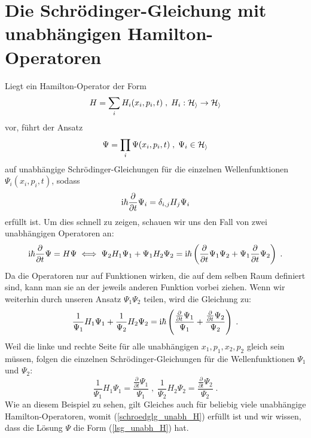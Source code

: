 \section{Die Schrödinger-Gleichung mit unabhängigen Hamilton-Operatoren}
  Liegt ein Hamilton-Operator der Form
  \begin{equation}
    H = \sum_i H_i(x_i,p_i,t) \;,\; H_i : \cal H_i \rightarrow H_i
    \label{unabh_H}
  \end{equation}
  vor, führt der Ansatz
  \begin{equation}
    \Psi = \prod_i \Psi(x_i,p_i,t) \; , \; \Psi_i \in \cal H_i
    \label{lsg_unabh_H}
  \end{equation}
  auf unabhängige Schrödinger-Gleichungen für die einzelnen Wellenfunktionen \\ $\Psi_i(x_i,p_i,t)$, sodass %
  \begin{equation}
    \text i \hbar \frac{\partial}{\partial t}\Psi_i = \delta_{i,j}  H_j \Psi_i
    \label{schroedglg_unabh_H}
  \end{equation}
  erfüllt ist.
  Um dies schnell zu zeigen, schauen wir uns den Fall von zwei unabhängigen Operatoren an:
  \begin{align}
    \begin{split}
      \text i \hbar \frac{\partial}{\partial t} \Psi = H\Psi \iff \Psi_2 H_1 \Psi_1 + \Psi_1 H_2 \Psi_2 = \text i \hbar \left(\frac{\partial}{\partial t} \Psi_1\Psi_2 + \Psi_1\frac{\partial}{\partial t} \Psi_2 \right) \; .
    \end{split}
  \end{align}
  Da die Operatoren nur auf Funktionen wirken, die auf dem selben Raum definiert sind, kann man sie an der jeweils anderen Funktion vorbei ziehen.
  Wenn wir weiterhin durch unseren Ansatz $\Psi_1\Psi_2$ teilen, wird die Gleichung zu:
  \begin{equation}
    \frac{1}{\Psi_1}H_1\Psi_1 + \frac{1}{\Psi_2}H_2\Psi_2 = \text i \hbar \left(\frac{\frac{\partial}{\partial t} \Psi_1}{\Psi_1} + \frac{\frac{\partial}{\partial t} \Psi_2}{\Psi_2} \right) \; .
  \end{equation}
  Weil die linke und rechte Seite für alle unabhängigen $x_1,p_1,x_2,p_2$ gleich sein müssen, folgen die einzelnen Schrödinger-Gleichungen für die Wellenfunktionen $\Psi_1$ und $\Psi_2$:
  \begin{equation}
    \frac{1}{\Psi_1}H_1\Psi_1 = \frac{\frac{\partial}{\partial t} \Psi_1}{\Psi_1} \; , \; \frac{1}{\Psi_2}H_2\Psi_2 = \frac{\frac{\partial}{\partial t} \Psi_2}{\Psi_2} \; .
  \end{equation}
  Wie an diesem Beispiel zu sehen, gilt Gleiches auch für beliebig viele unabhängige Hamilton-Operatoren, womit (\ref{schroedglg_unabh_H}) erfüllt ist und wir wissen, dass die Lösung $\Psi$ die Form (\ref{lsg_unabh_H}) hat.



